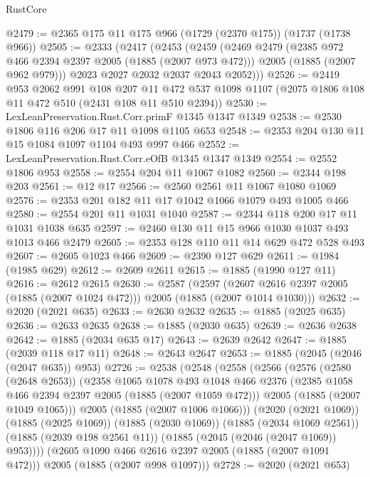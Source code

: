 \begin{lexlean}{RustCore}
\begin{coremodule}
@2479 := @2365 @175 @11 @175 @966 (@1729 (@2370 @175)) (@1737 (@1738 @966))
@2505 := @2333
    (@2417
      (@2453
        (@2459
          (@2469
            @2479
            (@2385 @972 @466 @2394 @2397 @2005 (@1885 (@2007 @973 @472)))
            @2005
            (@1885 (@2007 @962 @979)))
          @2023
          @2027
          @2032
          @2037
          @2043
          @2052)))
@2526 := @2419
    @953
    @2062
    @991
    @108
    @207
    @11
    @472
    @537
    @1098
    @1107
    (@2075 @1806 @108 @11 @472 @510 (@2431 @108 @11 @510 @2394))
@2530 := LexLeanPreservation.Rust.Corr.primF @1345 @1347 @1349
@2538 := @2530 @1806 @116 @206 @17 @11 @1098 @1105 @653
@2548 := @2353 @204 @130 @11 @15 @1084 @1097 @1104 @493 @997 @466
@2552 := LexLeanPreservation.Rust.Corr.eOfB @1345 @1347 @1349
@2554 := @2552 @1806 @953
@2558 := @2554 @204 @11 @1067 @1082
@2560 := @2344 @198 @203
@2561 := @12 @17
@2566 := @2560 @2561 @11 @1067 @1080 @1069
@2576 := @2353 @201 @182 @11 @17 @1042 @1066 @1079 @493 @1005 @466
@2580 := @2554 @201 @11 @1031 @1040
@2587 := @2344 @118 @200 @17 @11 @1031 @1038 @635
@2597 := @2460 @130 @11 @15 @966 @1030 @1037 @493 @1013 @466 @2479
@2605 := @2353 @128 @110 @11 @14 @629 @472 @528 @493
@2607 := @2605 @1023 @466
@2609 := @2390 @127 @629
@2611 := @1984 (@1985 @629)
@2612 := @2609 @2611
@2615 := @1885 (@1990 @127 @11)
@2616 := @2612 @2615
@2630 := @2587
    (@2597 (@2607 @2616 @2397 @2005 (@1885 (@2007 @1024 @472))) @2005 (@1885 (@2007 @1014 @1030)))
@2632 := @2020 (@2021 @635)
@2633 := @2630 @2632
@2635 := @1885 (@2025 @635)
@2636 := @2633 @2635
@2638 := @1885 (@2030 @635)
@2639 := @2636 @2638
@2642 := @1885 (@2034 @635 @17)
@2643 := @2639 @2642
@2647 := @1885 (@2039 @118 @17 @11)
@2648 := @2643 @2647
@2653 := @1885 (@2045 (@2046 (@2047 @635)) @953)
@2726 := @2538
    (@2548
      (@2558
        (@2566
          (@2576
            (@2580 (@2648 @2653))
            (@2358
              @1065
              @1078
              @493
              @1048
              @466
              @2376
              (@2385 @1058 @466 @2394 @2397 @2005 (@1885 (@2007 @1059 @472)))
              @2005
              (@1885 (@2007 @1049 @1065)))
            @2005
            (@1885 (@2007 @1006 @1066)))
          (@2020 (@2021 @1069))
          (@1885 (@2025 @1069))
          (@1885 (@2030 @1069))
          (@1885 (@2034 @1069 @2561))
          (@1885 (@2039 @198 @2561 @11))
          (@1885 (@2045 (@2046 (@2047 @1069)) @953))))
      (@2605 @1090 @466 @2616 @2397 @2005 (@1885 (@2007 @1091 @472)))
      @2005
      (@1885 (@2007 @998 @1097)))
@2728 := @2020 (@2021 @653)

\end{coremodule}
\end{lexlean}
